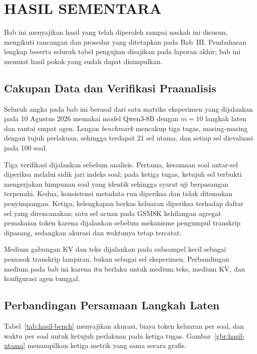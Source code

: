 \chapter{HASIL SEMENTARA}

Bab ini menyajikan hasil yang telah diperoleh sampai naskah ini disusun,
mengikuti rancangan dan prosedur yang ditetapkan pada Bab~III. Pembahasan
lengkap beserta seluruh tabel pengujian disajikan pada laporan akhir; bab ini
memuat hasil pokok yang sudah dapat disimpulkan.

\section{Cakupan Data dan Verifikasi Praanalisis}

Seluruh angka pada bab ini berasal dari satu matriks eksperimen yang dijalankan
pada 10 Agustus 2026 memakai model Qwen3-8B dengan $m=10$ langkah laten dan
rantai empat agen. Lengan \textit{benchmark} mencakup tiga tugas, masing-masing
dengan tujuh perlakuan, sehingga terdapat 21 sel utama, dan setiap sel
dievaluasi pada 100 soal.

Tiga verifikasi dijalankan sebelum analisis. Pertama, kesamaan soal antar-sel
diperiksa melalui sidik jari indeks soal; pada ketiga tugas, ketujuh sel
terbukti mengerjakan himpunan soal yang identik sehingga syarat uji berpasangan
terpenuhi. Kedua, konsistensi metadata run diperiksa dan tidak ditemukan
penyimpangan. Ketiga, kelengkapan berkas keluaran diperiksa terhadap daftar sel
yang direncanakan; satu sel acuan pada GSM8K kehilangan agregat pemakaian token
karena dijalankan sebelum mekanisme pengumpul transkrip dipasang, sedangkan
akurasi dan waktunya tetap tercatat.

Medium gabungan KV dan teks dijalankan pada subsampel kecil sebagai pemasok
transkrip lampiran, bukan sebagai sel eksperimen. Perbandingan medium pada bab
ini karena itu berlaku untuk medium teks, medium KV, dan konfigurasi agen
tunggal.

\section{Perbandingan Persamaan Langkah Laten}



Tabel~\ref{tab:hasil-bench} menyajikan akurasi, biaya token keluaran per soal,
dan waktu per soal untuk ketujuh perlakuan pada ketiga tugas.
Gambar~\ref{gbr:hasil-utama} menampilkan ketiga metrik yang sama secara grafis.

